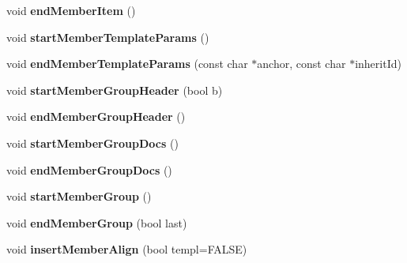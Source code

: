 \begin{DoxyCompactItemize}
\item 
\hypertarget{class_output_list_aeca4b74189a714a52d2e5837e453a0d6}{void {\bfseries end\-Member\-Item} ()}\label{class_output_list_aeca4b74189a714a52d2e5837e453a0d6}

\item 
\hypertarget{class_output_list_abeb4730c77d34d8a191a957032cd4008}{void {\bfseries start\-Member\-Template\-Params} ()}\label{class_output_list_abeb4730c77d34d8a191a957032cd4008}

\item 
\hypertarget{class_output_list_a134f062c16fa5e97c706661cbb1112d0}{void {\bfseries end\-Member\-Template\-Params} (const char $\ast$anchor, const char $\ast$inherit\-Id)}\label{class_output_list_a134f062c16fa5e97c706661cbb1112d0}

\item 
\hypertarget{class_output_list_aaffb8da1d4abc1634d78343398aaf837}{void {\bfseries start\-Member\-Group\-Header} (bool b)}\label{class_output_list_aaffb8da1d4abc1634d78343398aaf837}

\item 
\hypertarget{class_output_list_a7e1a44a13d8b22dc7929a9cdbd94b725}{void {\bfseries end\-Member\-Group\-Header} ()}\label{class_output_list_a7e1a44a13d8b22dc7929a9cdbd94b725}

\item 
\hypertarget{class_output_list_aa8c7357f48d452ccd00a331623c4674a}{void {\bfseries start\-Member\-Group\-Docs} ()}\label{class_output_list_aa8c7357f48d452ccd00a331623c4674a}

\item 
\hypertarget{class_output_list_a0e63ff5117b5bd3305323117412c6ff1}{void {\bfseries end\-Member\-Group\-Docs} ()}\label{class_output_list_a0e63ff5117b5bd3305323117412c6ff1}

\item 
\hypertarget{class_output_list_a00a5eb19d218888ab778e3a2805f78a6}{void {\bfseries start\-Member\-Group} ()}\label{class_output_list_a00a5eb19d218888ab778e3a2805f78a6}

\item 
\hypertarget{class_output_list_ab0445d7ef83a9d4c7fa20dedf431ca52}{void {\bfseries end\-Member\-Group} (bool last)}\label{class_output_list_ab0445d7ef83a9d4c7fa20dedf431ca52}

\item 
\hypertarget{class_output_list_a9ee5fe2ccc63b3017f8769d37fc17f8e}{void {\bfseries insert\-Member\-Align} (bool templ=F\-A\-L\-S\-E)}\label{class_output_list_a9ee5fe2ccc63b3017f8769d37fc17f8e}


\end{DoxyCompactItemize}
